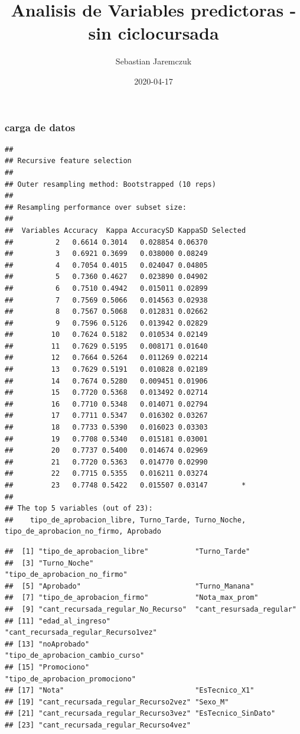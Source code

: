 \documentclass[]{article}
\title{Analisis de Variables predictoras - sin ciclocursada}
\author{Sebastian Jaremczuk}
\date{2020-04-17}
\begin{document}
\maketitle

\hypertarget{carga-de-datos}{%
\subsubsection{carga de datos}\label{carga-de-datos}}

\begin{lstlisting}
## 
## Recursive feature selection
## 
## Outer resampling method: Bootstrapped (10 reps) 
## 
## Resampling performance over subset size:
## 
##  Variables Accuracy  Kappa AccuracySD KappaSD Selected
##          2   0.6614 0.3014   0.028854 0.06370         
##          3   0.6921 0.3699   0.038000 0.08249         
##          4   0.7054 0.4015   0.024047 0.04805         
##          5   0.7360 0.4627   0.023890 0.04902         
##          6   0.7510 0.4942   0.015011 0.02899         
##          7   0.7569 0.5066   0.014563 0.02938         
##          8   0.7567 0.5068   0.012831 0.02662         
##          9   0.7596 0.5126   0.013942 0.02829         
##         10   0.7624 0.5182   0.010534 0.02149         
##         11   0.7629 0.5195   0.008171 0.01640         
##         12   0.7664 0.5264   0.011269 0.02214         
##         13   0.7629 0.5191   0.010828 0.02189         
##         14   0.7674 0.5280   0.009451 0.01906         
##         15   0.7720 0.5368   0.013492 0.02714         
##         16   0.7710 0.5348   0.014071 0.02794         
##         17   0.7711 0.5347   0.016302 0.03267         
##         18   0.7733 0.5390   0.016023 0.03303         
##         19   0.7708 0.5340   0.015181 0.03001         
##         20   0.7737 0.5400   0.014674 0.02969         
##         21   0.7720 0.5363   0.014770 0.02990         
##         22   0.7715 0.5355   0.016211 0.03274         
##         23   0.7748 0.5422   0.015507 0.03147        *
## 
## The top 5 variables (out of 23):
##    tipo_de_aprobacion_libre, Turno_Tarde, Turno_Noche, tipo_de_aprobacion_no_firmo, Aprobado
\end{lstlisting}

\begin{lstlisting}
##  [1] "tipo_de_aprobacion_libre"           "Turno_Tarde"                       
##  [3] "Turno_Noche"                        "tipo_de_aprobacion_no_firmo"       
##  [5] "Aprobado"                           "Turno_Manana"                      
##  [7] "tipo_de_aprobacion_firmo"           "Nota_max_prom"                     
##  [9] "cant_recursada_regular_No_Recurso"  "cant_resursada_regular"            
## [11] "edad_al_ingreso"                    "cant_recursada_regular_Recurso1vez"
## [13] "noAprobado"                         "tipo_de_aprobacion_cambio_curso"   
## [15] "Promociono"                         "tipo_de_aprobacion_promociono"     
## [17] "Nota"                               "EsTecnico_X1"                      
## [19] "cant_recursada_regular_Recurso2vez" "Sexo_M"                            
## [21] "cant_recursada_regular_Recurso3vez" "EsTecnico_SinDato"                 
## [23] "cant_recursada_regular_Recurso4vez"
\end{lstlisting}
\end{document}
